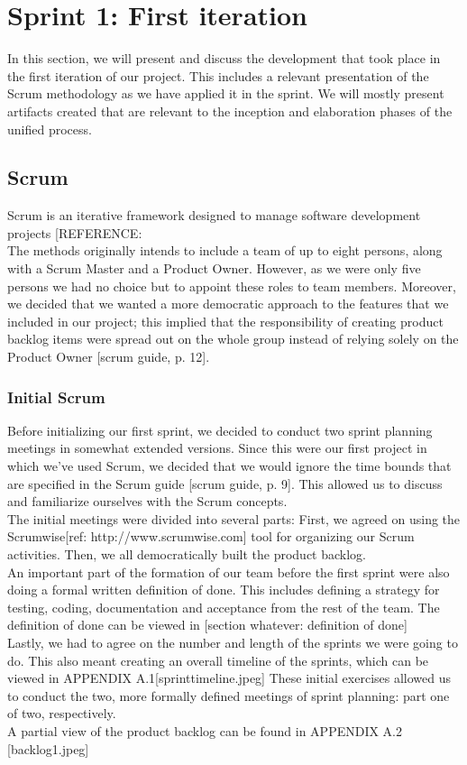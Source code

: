 \section{Sprint 1: First iteration}
In this section, we will present and discuss the development that took place in the first iteration of our project. This includes a relevant presentation of the Scrum methodology as we have applied it in the sprint. We will mostly present artifacts created that are relevant to the inception and elaboration phases of the unified process.
\subsection{Scrum}
Scrum is an iterative framework designed to manage software development projects [REFERENCE:\\ %
The methods originally intends to include a team of up to eight persons, along with a Scrum Master and a Product Owner. However, as we were only five persons we had no choice but to appoint these roles to team members. Moreover, we decided that we wanted a more democratic approach to the features that we included in our project; this implied that the responsibility of creating product backlog items were spread out on the whole group instead of relying solely on the Product Owner [scrum guide, p. 12].\\
\subsubsection{Initial Scrum}
Before initializing our first sprint, we decided to conduct two sprint planning meetings in somewhat extended versions. Since this were our first project in which we’ve used Scrum, we decided that we would ignore the time bounds that are specified in the Scrum guide [scrum guide, p. 9]. This allowed us to discuss and familiarize ourselves with the Scrum concepts.\\
The initial meetings were divided into several parts: First, we agreed on using the Scrumwise[ref: http://www.scrumwise.com] tool for organizing our Scrum activities. Then, we all democratically built the product backlog. \\
An important part of the formation of our team before the first sprint were also doing a formal written definition of done. This includes defining a strategy for testing, coding, documentation and acceptance from the rest of the team. The definition of done can be viewed in [section whatever: definition of done]\\
Lastly, we had to agree on the number and length of the sprints we were going to do. This also meant creating an overall timeline of the sprints, which can be viewed in APPENDIX A.1[sprinttimeline.jpeg]  These initial exercises allowed us to conduct the two, more formally defined meetings of sprint planning: part one of two, respectively. \\
A partial view of the product backlog can be found in APPENDIX A.2 [backlog1.jpeg]\\
